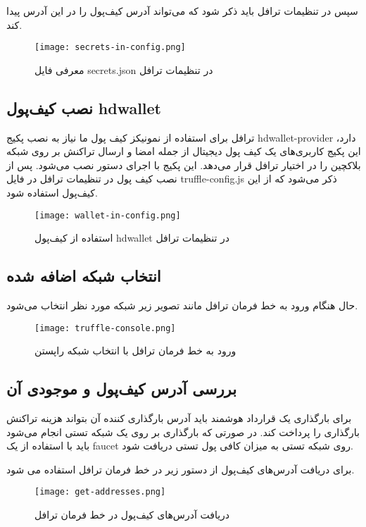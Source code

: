 سپس در تنظیمات ترافل باید ذکر شود که می‌تواند آدرس کیف‌پول را در این آدرس پیدا کند.

\begin{figure}[ht]
\centerline{\texttt{[image: secrets-in-config.png]}}
\caption{معرفی فایل secrets.json در تنظیمات ترافل}
\label{fig:secrets-in-config}
\end{figure}


\subsection{نصب کیف‌پول hdwallet}
ترافل برای استفاده از نمونیکز کیف پول ما نیاز به نصب پکیج hdwallet-provider دارد، این پکیج کاربری‌های یک کیف پول دیجیتال از جمله امضا و ارسال تراکنش بر روی شبکه بلاکچین را در اختیار ترافل قرار می‌دهد. این پکیج با اجرای دستور
نصب می‌شود.  پس از نصب کیف پول در تنظیمات ترافل در فایل truffle-config.js ذکر می‌شود که از این کیف‌پول استفاده شود.

\begin{figure}[ht]
\centerline{\texttt{[image: wallet-in-config.png]}}
\caption{استفاده از کیف‌پول hdwallet در تنظیمات ترافل}
\label{fig:wallet-in-config}
\end{figure}


\subsection{انتخاب شبکه اضافه شده}
حال هنگام ورود به خط فرمان ترافل مانند تصویر زیر شبکه مورد نظر انتخاب می‌شود.

\begin{figure}[ht]
\centerline{\texttt{[image: truffle-console.png]}}
\caption{ورود به خط فرمان ترافل با انتخاب شبکه راپستن}
\label{fig:truffle-console}
\end{figure}


\subsection{بررسی آدرس کیف‌پول و موجودی آن}
برای بارگذاری یک قرارداد هوشمند باید آدرس بارگذاری کننده آن بتواند هزینه تراکنش بارگذاری را پرداخت کند. در صورتی که بارگذاری بر روی یک شبکه تستی انجام می‌شود باید با استفاده از یک faucet روی شبکه تستی به میزان کافی پول تستی دریافت شود.

برای دریافت آدرس‌های کیف‌پول از دستور زیر در خط فرمان ترافل استفاده می شود.

\begin{figure}[ht]
\centerline{\texttt{[image: get-addresses.png]}}
\caption{دریافت آدرس‌های کیف‌پول در خط فرمان ترافل}
\label{fig:get-addresses}
\end{figure}


